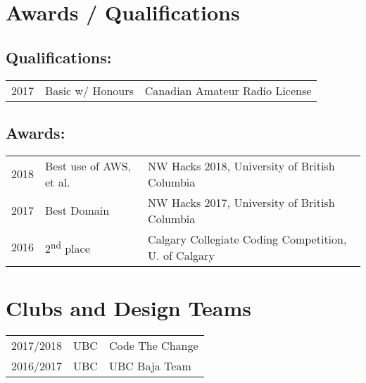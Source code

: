 \documentclass[]{deedy-resume-openfont}
\begin{document}
\begin{minipage}[t]{0.66\textwidth}

\section{Awards / Qualifications} 
\subsection{Qualifications:}
\begin{tabular}{rll}
2017         & Basic w/ Honours \qquad & Canadian Amateur Radio License\\
\end{tabular}

\subsection{Awards:}
\begin{tabular}{rll}
2018         & Best use of AWS, et al.      & NW Hacks 2018, University of British Columbia\\
2017         & Best Domain                  & NW Hacks 2017, University of British Columbia\\
2016         & 2\textsuperscript{nd} place  & Calgary Collegiate Coding Competition, U. of Calgary\\
\end{tabular}
\sectionsep


\section{Clubs and Design Teams} 

\begin{tabular}{rll}
2017/2018   & UBC   & Code The Change\\
2016/2017   & UBC   & UBC Baja Team\\
\end{tabular}
\sectionsep

\end{minipage} 
\end{document}
